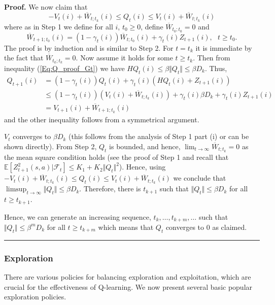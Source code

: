 \documentclass[letter,11pt]{article}
\newenvironment {proof}[1][Proof]{\noindent \textbf {#1.} }{\ \rule {0.5em}{0.5em}}
\begin{document}
\begin{proof}
 We now claim that $$-V_{t}(i) + \overline{W}_{t;t_{k}} (i) \leq Q_{t} (i) \leq V_{t}(i) + \overline{W}_{t;t_{k}} (i) $$ where as in Step 1 we define
  for all $i$, $t_{0} \geq 0$, define  $\overline{W}_{t_{0}; t_{0} } = 0$ and
     $$\overline{W}_{t+1;t_{0}} (i) = (1-\gamma_{t}(i)) \overline{W}_{t;t_{0}} (i) + \gamma_{t}(i) Z_{t+1} (i) , \text{ } t \geq t_{0}. $$
 The proof is by induction and is similar to Step 2. For $t= t_{k}$ it is immediate by the fact that $\overline{W}_{t_{k} ; t_{k} } = 0$. Now assume it holds for some $t \geq t_{k}$. Then from inequality (\ref{Eq:Q_proof_Gt}) we have $HQ_{t}(i) \leq \beta \Vert Q_{t} \Vert \leq \beta D_{k}$. Thus,
\begin{align*}
    Q_{t+1}(i) & = (1- \gamma_{t}(i) )Q_{t}(i) + \gamma_{t}(i) (HQ_{t}(i) + Z_{t+1} (i) ) \\
   & \leq (1- \gamma_{t}(i) ) ( V_{t}(i) + \overline{W}_{t;t_{k}} (i)  ) + \gamma_{t}(i) \beta D_{k} +  \gamma_{t}(i)  Z_{t+1} (i) \\
   & = V_{t+1}(i) + \overline{W}_{t+1;t_{k}} (i)
\end{align*}
and the other inequality follows from a symmetrical argument. 

 $V_{t}$ converges to $\beta D_{k} $ (this follows from the analysis of Step 1 part (i) or can be shown directly). From Step 2, $Q_{t}$ is bounded, and hence, $\lim _{t \rightarrow \infty} \overline{W}_{t;t_{k}} = 0$ as the mean square condition holds (see the proof of Step 1 and recall that $\mathbb{E} [Z_{t+1}^{2} (s,a) | \mathcal{F}_{t} ] \leq K_{1} + K_{2} \Vert Q_{t} \Vert^{2} $). Hence, using  $-V_{t}(i) + \overline{W}_{t;t_{k}} (i) \leq Q_{t} (i) \leq V_{t}(i) + \overline{W}_{t;t_{k}} (i) $ we conclude that $\limsup_{t\rightarrow \infty} \Vert Q_{t} \Vert \leq \beta D_{k}$. Therefore, there is $t_{k+1}$ such that $\Vert Q_{t} \Vert \leq \beta D_{k}$ for all $t \geq t_{k+1}$. 

Hence, we can generate an increasing sequence, $t_{k},\ldots,t_{k+m},\ldots$ such that $\Vert Q_{t} \Vert \leq \beta ^{m} D_{k}$ for all $t \geq t_{k+m}$ which means that $Q_{t}$ converges to $0$ as claimed. 
\end{proof}


\subsubsection{Exploration}
There are various policies for balancing exploration and exploitation, which are crucial for the effectiveness of Q-learning. We now present several basic popular exploration policies. 
\end{document}
